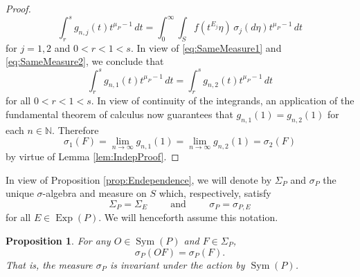 \documentclass[11pt]{article}
\newtheorem{proposition}[theorem]{Proposition}
\newcommand\Sym{\operatorname{Sym}}
\newcommand\Exp{\operatorname{Exp}}
\begin{document}
\begin{proof}
\begin{equation}\label{eq:SameMeasure2}
\int_r^sg_{n,j}(t)t^{\mu_P-1}\,dt=\int_0^\infty \int_S f(t^{E_j}\eta)\,\sigma_j(d\eta)t^{\mu_P-1}\,dt
\end{equation}
for $j=1,2$ and $0<r<1<s$. In view of \eqref{eq:SameMeasure1} and \eqref{eq:SameMeasure2}, we conclude that
\begin{equation*}
\int_r^s g_{n,1}(t)t^{\mu_P-1}\,dt=\int_r^s g_{n,2}(t)t^{\mu_P-1}\,dt
\end{equation*}
for all $0<r<1<s$. In view of continuity of the integrands, an application of the fundamental theorem of calculus now guarantees that $g_{n,1}(1)=g_{n,2}(1)$ for each $n\in\mathbb{N}$. Therefore
\begin{equation*}
\sigma_1(F)=\lim_{n\to\infty}g_{n,1}(1)=\lim_{n\to\infty}g_{n,2}(1)=\sigma_2(F)
\end{equation*}
by virtue of Lemma \ref{lem:IndepProof}.
\end{proof}

\noindent In view of Proposition \ref{prop:Endependence}, we will denote by $\Sigma_P$ and $\sigma_P$ the unique $\sigma$-algebra and measure on $S$ which, respectively, satisfy
\begin{equation*}
    \Sigma_P=\Sigma_E\hspace{1cm}\mbox{and}\hspace{1cm}\sigma_P=\sigma_{P,E}
\end{equation*}
for all $E\in\Exp(P)$. We will henceforth assume this notation. 



\begin{proposition}\label{prop:SymInvariance}
For any $O\in\Sym(P)$ and $F\in\Sigma_P$,
\begin{equation*}
\sigma_P(O F)=\sigma_P(F).
\end{equation*} 
That is, the measure $\sigma_P$ is invariant under the action by $\Sym(P)$. 
\end{proposition}
\end{document}
